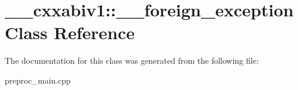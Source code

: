 \hypertarget{class____cxxabiv1_1_1____foreign__exception}{\section{\+\_\+\+\_\+cxxabiv1\+:\+:\+\_\+\+\_\+foreign\+\_\+exception Class Reference}
\label{class____cxxabiv1_1_1____foreign__exception}
}


The documentation for this class was generated from the following file\+:\begin{DoxyCompactItemize}
\item 
preproc\+\_\+main.\+cpp\end{DoxyCompactItemize}
